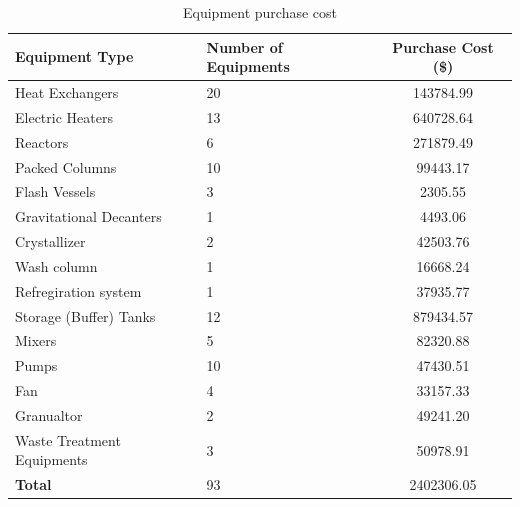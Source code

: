 \begin{table}[H]
\centering
\caption{Equipment purchase cost}
\label{tab:equipment purchase}
\begin{tabular}{llS[table-format=7.2,round-mode=figures,round-precision=3]}
\toprule
\textbf{Equipment Type}    & \textbf{Number of Equipments} & \textbf{Purchase Cost (\$)} \\\midrule
Heat Exchangers            & 20                            & 143784.99                  \\
Electric Heaters           & 13                            & 640728.64                  \\
Reactors                   & 6                             & 271879.49                  \\
Packed Columns             & 10                            & 99443.17                   \\
Flash Vessels              & 3                             & 2305.55                    \\
Gravitational Decanters    & 1                             & 4493.06                    \\
Crystallizer               & 2                             & 42503.76                   \\
Wash column                & 1                             & 16668.24                   \\
Refregiration system       & 1                             & 37935.77                   \\
Storage (Buffer) Tanks     & 12                            & 879434.57                  \\
Mixers                     & 5                             & 82320.88                   \\
Pumps                      & 10                            & 47430.51                   \\
Fan                        & 4                             & 33157.33                   \\
Granualtor                 & 2                             & 49241.20                   \\
Waste Treatment Equipments & 3                             & 50978.91                   \\ \midrule
\textbf{Total}             & 93                            & 2402306.05                 \\ \bottomrule
\end{tabular}
\end{table}

